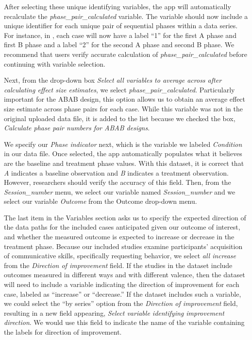 \documentclass[
]{book}
\begin{document}
After selecting these unique identifying variables, the app will automatically recalculate the \emph{phase\_pair\_calculated} variable. The variable should now include a unique identifier for each unique pair of sequential phases within a data series. For instance, in \citet{Byiers2014}, each case will now have a label ``1'' for the first A phase and first B phase and a label ``2'' for the second A phase and second B phase. We recommend that users verify accurate calculation of \emph{phase\_pair\_calculated} before continuing with variable selection.

Next, from the drop-down box \emph{Select all variables to average across after calculating effect size estimates}, we select \emph{phase\_pair\_calculated}. Particularly important for the \citet{Byiers2014} ABAB design, this option allows us to obtain an average effect size estimate across phase pairs for each case. While this variable was not in the original uploaded data file, it is added to the list because we checked the box, \emph{Calculate phase pair numbers for ABAB designs}.

We specify our \emph{Phase indicator} next, which is the variable we labeled \emph{Condition} in our data file. Once selected, the app automatically populates what it believes are the baseline and treatment phase values. With this dataset, it is correct that \emph{A} indicates a baseline observation and \emph{B} indicates a treatment observation. However, researchers should verify the accuracy of this field. Then, from the \emph{Session\_number} menu, we select our variable named \emph{Session\_number} and we select our variable \emph{Outcome} from the Outcome drop-down menu.

The last item in the Variables section asks us to specify the expected direction of the data paths for the included cases anticipated given our outcome of interest, and whether the measured outcome is expected to increase or decrease in the treatment phase. Because our included studies examine participants' acquisition of communicative skills, specifically requesting behavior, we select \emph{all increase} from the \emph{Direction of improvement} field. If the studies in the dataset include outcomes measured in different ways and with different valence, then the dataset will need to include a variable indicating the direction of improvement for each case, labeled as ``increase'' or ``decrease.'' If the dataset includes such a variable, we could select the ``by series'' option from the \emph{Direction of improvement} field, resulting in a new field appearing, \emph{Select variable identifying improvement direction}. We would use this field to indicate the name of the variable containing the labels for direction of improvement.
\end{document}
